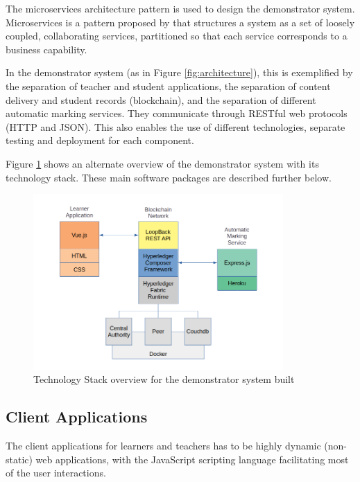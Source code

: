 The microservices architecture pattern is used to design the demonstrator system. Microservices is a pattern proposed by 
\citet{richardson2018ms} that structures a system as a set of loosely coupled, collaborating services, partitioned so that 
each service corresponds to a business capability.

In the demonstrator system (as in Figure \ref{fig:architecture}), this is exemplified by the separation of teacher and student applications, 
the separation of content delivery and student records (blockchain), and the separation of different automatic marking services.
They communicate through RESTful web protocols (HTTP and JSON). 
This also enables the use of different technologies, separate testing and deployment for each component.

Figure \ref{fig:techstack} shows an alternate overview of the demonstrator system with its technology stack. 
These main software packages are described further below.

\begin{figure}[!ht] 
    \centering    
    \includegraphics[width=0.85\textwidth]{techstack}
    \caption[Demonstrator Technology Stack]
        {Technology Stack overview for the demonstrator system built}
    \label{fig:techstack}
\end{figure} 

\subsection{Client Applications}

The client applications for learners and teachers has to be highly dynamic (non-static) web applications, 
with the JavaScript scripting language facilitating most of the user interactions.

